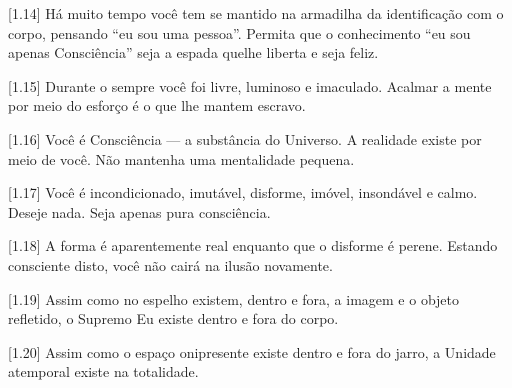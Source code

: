 [1.14] Há muito tempo você tem se mantido na armadilha da identificação com o corpo, pensando ``eu sou uma pessoa''. Permita que o conhecimento ``eu sou apenas Consciência'' seja a espada quelhe liberta e seja feliz.

[1.15] Durante o sempre você foi livre, luminoso e imaculado. Acalmar a mente por meio do esforço é o que lhe mantem escravo.

[1.16] Você é Consciência --- a substância do Universo. A realidade existe por meio de você. Não mantenha uma mentalidade pequena.

[1.17] Você é incondicionado, imutável, disforme, imóvel, insondável e calmo. Deseje nada. Seja apenas pura consciência.

[1.18] A forma é aparentemente real enquanto que o disforme é perene. Estando consciente disto, você não cairá na ilusão novamente.

[1.19] Assim como no espelho existem, dentro e fora, a imagem e o objeto refletido, o Supremo Eu existe dentro e fora do corpo.

[1.20] Assim como o espaço onipresente existe dentro e fora do jarro, a Unidade atemporal existe na totalidade.
